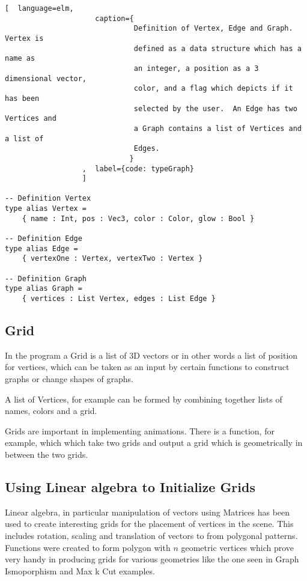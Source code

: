\begin{lstlisting}[  language=elm, 
                     caption={
                              Definition of Vertex, Edge and Graph.  Vertex is
                              defined as a data structure which has a name as
                              an integer, a position as a 3 dimensional vector,
                              color, and a flag which depicts if it has been
                              selected by the user.  An Edge has two Vertices and
                              a Graph contains a list of Vertices and a list of
                              Edges.
                             }
                  ,  label={code: typeGraph}
                  ]

-- Definition Vertex
type alias Vertex =
    { name : Int, pos : Vec3, color : Color, glow : Bool }

-- Definition Edge
type alias Edge =
    { vertexOne : Vertex, vertexTwo : Vertex }

-- Definition Graph
type alias Graph =
    { vertices : List Vertex, edges : List Edge }
\end{lstlisting}

\subsection{Grid}
In the program a Grid is a list of 3D vectors or in other words a list of
position for vertices, which can be taken as an input by certain functions to
construct graphs or change shapes of graphs. 

A list of Vertices, for example can be formed by combining together lists of
names, colors and a grid.

Grids are important in implementing animations. There is a function, for
example, which which take two grids and output a grid which is geometrically in
between the two grids.

\subsection{Using Linear algebra to Initialize Grids}
Linear algebra, in particular manipulation of vectors using Matrices has been
used to create interesting grids for the placement of vertices in the scene.
This includes rotation, scaling and translation of vectors to from polygonal
patterns. Functions were created to form polygon with $n$ geometric vertices
which prove very handy in producing grids for various geometries like
the one seen in Graph Ismoporphism and Max k Cut examples.

